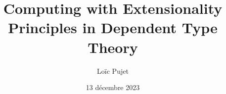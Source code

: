 \documentclass[
	a4paper, %
	fontsize=10pt, %
	twoside=false, %
	numbers=noenddot, %
]{kaobook}
\begin{document}


\clearpage
\thispagestyle{empty}
\null%
\clearpage


\titlehead{Computing with Extensionality Principles}
\subject{Thèse de Doctorat}

\title[Computing with Extensionality Principles]{Computing with Extensionality Principles in Dependent Type Theory}

\author[Loïc Pujet]{Loïc Pujet}

\date{13 décembre 2023}

\publishers{École Doctorale MathSTIC}


\frontmatter %





\end{document}
